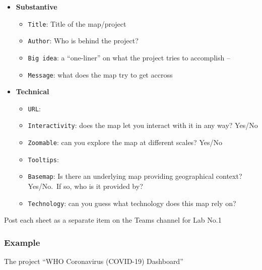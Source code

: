 \documentclass[
  letterpaper,
  DIV=11,
  numbers=noendperiod]{scrreprt}
\providecommand{\tightlist}{%
  \setlength{\itemsep}{0pt}\setlength{\parskip}{0pt}}\usepackage{longtable,booktabs,array}
\begin{document}
\begin{itemize}
\tightlist
\item
  \textbf{Substantive}

  \begin{itemize}
  \tightlist
  \item
    \texttt{Title}: Title of the map/project
  \item
    \texttt{Author}: Who is behind the project?
  \item
    \texttt{Big\ idea}: a ``one-liner'' on what the project tries to
    accomplish --
  \item
    \texttt{Message}: what does the map try to get accross
  \end{itemize}
\item
  \textbf{Technical}

  \begin{itemize}
  \tightlist
  \item
    \texttt{URL}:
  \item
    \texttt{Interactivity}: does the map let you interact with it in any
    way? Yes/No
  \item
    \texttt{Zoomable}: can you explore the map at different scales?
    Yes/No
  \item
    \texttt{Tooltips}:
  \item
    \texttt{Basemap}: Is there an underlying map providing geographical
    context? Yes/No.~If so, who is it provided by?
  \item
    \texttt{Technology}: can you guess what technology does this map
    rely on?
  \end{itemize}
\end{itemize}

Post each sheet as a separate item on the Teams channel for Lab No.1

\subsubsection{Example}\label{example}

The project ``WHO Coronavirus (COVID-19) Dashboard''
\end{document}
